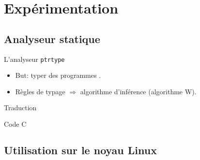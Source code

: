 \section{Expérimentation}

\subsection{Analyseur statique}

\begin{frame}{L'analyseur \texttt{ptrtype}}

\begin{itemize}
    \item But: typer des programmes \newspeak.
    \item Règles de typage $⇒$ algorithme d'inférence (algorithme W).
\end{itemize}
\end{frame}

\begin{frame}{Traduction}
\begin{block}{Code C}
\end{block}



\end{frame}

\subsection{Utilisation sur le noyau Linux}

